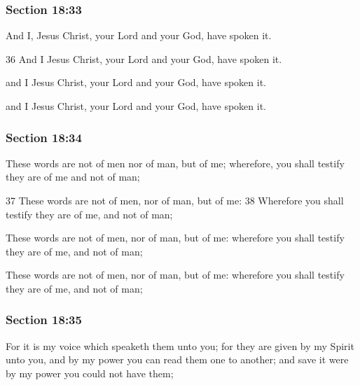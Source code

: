 	\subsubsection{Section 18:33} %
		\label{DC18-33}

		And I, Jesus Christ, your Lord and your God, have spoken it.

		\begin{framed}
		\scriptsize
			\begin{compactdesc}
				\item[JSP] 36 And I Jesus Christ, your Lord and your God, have spoken it.
				\item[DC 1835] and I Jesus Christ, your Lord and your God, have spoken it. 
				\item[DC 1844] and I Jesus Christ, your Lord and your God, have spoken it. 
			\end{compactdesc}
		\end{framed}

	\subsubsection{Section 18:34} %
		\label{DC18-34}

		These words are not of men nor of man, but of me; wherefore, you shall testify they are of me and not of man;

		\begin{framed}
		\scriptsize
			\begin{compactdesc}
				\item[JSP] 37 These words are not of men, nor of man, but of me: 38 Wherefore you shall testify they are of me, and not of man; 
				\item[DC 1835] These words are not of men, nor of man, but of me: wherefore you shall testify they are of me, and not of man; 
				\item[DC 1844] These words are not of men, nor of man, but of me: wherefore you shall testify they are of me, and not of man; 
			\end{compactdesc}
		\end{framed}

	\subsubsection{Section 18:35} %
		\label{DC18-35}

		For it is my voice which speaketh them unto you; for they are given by my Spirit unto you, and by my power you can read them one to another; and save it were by my power you could not have them;

